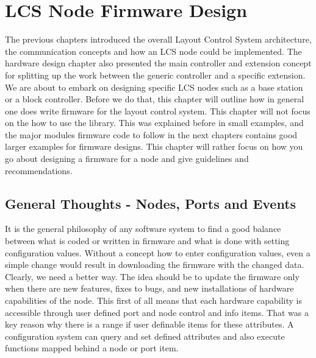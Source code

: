 \chapter{LCS Node Firmware Design}

The previous chapters introduced the overall Layout Control System architecture, the communication concepts and how an LCS node could be implemented. The hardware design chapter also presented the main controller and extension concept for splitting up the work between the generic controller and a specific extension. We are about to embark on designing specific LCS nodes such as a base station or a block controller. Before we do that, this chapter will outline how in general one does write firmware for the layout control system. This chapter will not focus on the how to use the library. This was explained before in small examples, and the major modules firmware code to follow in the next chapters contains good larger examples for firmware designs. This chapter will rather focus on how you go about designing a firmware for a node and give guidelines and recommendations.

\section{General Thoughts - Nodes, Ports and Events}

It is the general philosophy of any software system to find a good balance between what is coded or written in firmware and what is done with setting configuration values. Without a concept how to enter configuration values, even a simple change would result in downloading the firmware with the changed data. Clearly, we need a better way. The idea should be to update the firmware only when there are new features, fixes to bugs, and new installations of hardware capabilities of the node. This first of all means that each hardware capability is accessible through user defined port and node control and info items. That was a key reason why there is a range if user definable items for these attributes. A configuration system can query and set defined attributes and also execute functions mapped behind a node or port item.

